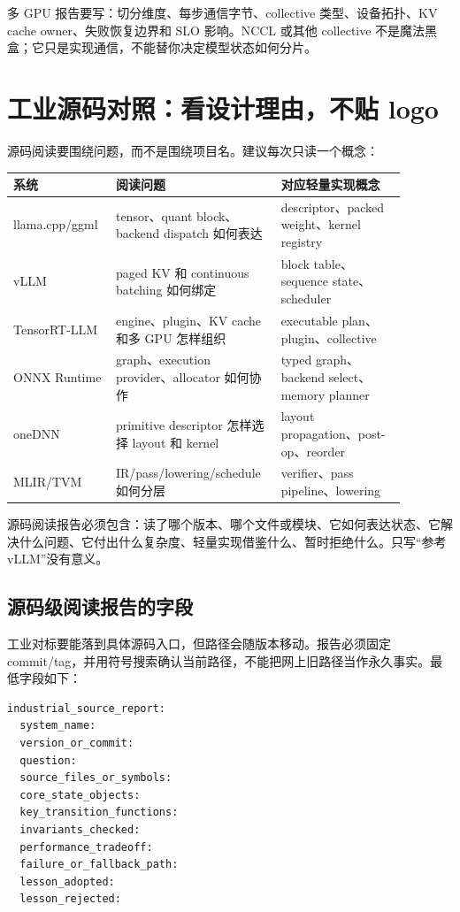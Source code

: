 多 GPU 报告要写：切分维度、每步通信字节、collective 类型、设备拓扑、KV cache owner、失败恢复边界和 SLO 影响。NCCL 或其他 collective 不是魔法黑盒；它只是实现通信，不能替你决定模型状态如何分片。

\section{工业源码对照：看设计理由，不贴 logo}

源码阅读要围绕问题，而不是围绕项目名。建议每次只读一个概念：

\begin{center}
\small
\begin{tabular}{p{0.24\linewidth}p{0.34\linewidth}p{0.30\linewidth}}
\toprule
系统 & 阅读问题 & 对应轻量实现概念 \\
\midrule
llama.cpp/ggml & tensor、quant block、backend dispatch 如何表达 & descriptor、packed weight、kernel registry \\
vLLM & paged KV 和 continuous batching 如何绑定 & block table、sequence state、scheduler \\
TensorRT-LLM & engine、plugin、KV cache 和多 GPU 怎样组织 & executable plan、plugin、collective \\
ONNX Runtime & graph、execution provider、allocator 如何协作 & typed graph、backend select、memory planner \\
oneDNN & primitive descriptor 怎样选择 layout 和 kernel & layout propagation、post-op、reorder \\
MLIR/TVM & IR/pass/lowering/schedule 如何分层 & verifier、pass pipeline、lowering \\
\bottomrule
\end{tabular}
\end{center}

源码阅读报告必须包含：读了哪个版本、哪个文件或模块、它如何表达状态、它解决什么问题、它付出什么复杂度、轻量实现借鉴什么、暂时拒绝什么。只写“参考 vLLM”没有意义。

\subsection{源码级阅读报告的字段}

工业对标要能落到具体源码入口，但路径会随版本移动。报告必须固定 commit/tag，并用符号搜索确认当前路径，不能把网上旧路径当作永久事实。最低字段如下：

\begin{lstlisting}[numbers=none,caption={工业源码阅读报告模板}]
industrial_source_report:
  system_name:
  version_or_commit:
  question:
  source_files_or_symbols:
  core_state_objects:
  key_transition_functions:
  invariants_checked:
  performance_tradeoff:
  failure_or_fallback_path:
  lesson_adopted:
  lesson_rejected:
\end{lstlisting}

